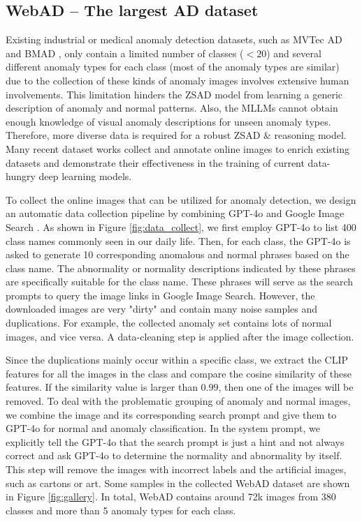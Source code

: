 \subsection{WebAD -- The largest AD dataset}
Existing industrial or medical anomaly detection datasets, such as MVTec AD \cite{mvtec} and BMAD \cite{bmad}, only contain a limited number of classes ($<20$) and several different anomaly types for each class (most of the anomaly types are similar) due to the collection of these kinds of anomaly images involves extensive human involvements. This limitation hinders the ZSAD model from learning a generic description of anomaly and normal patterns. Also, the MLLMs cannot obtain enough knowledge of visual anomaly descriptions for unseen anomaly types. Therefore, more diverse data is required for a robust ZSAD \& reasoning model. Many recent dataset works collect and annotate online images to enrich existing datasets and demonstrate their effectiveness in the training of current data-hungry deep learning models. 

To collect the online images that can be utilized for anomaly detection, we design an automatic data collection pipeline by combining GPT-4o \cite{gpt-api-4o} and Google Image Search \cite{google-image-search}. As shown in Figure \ref{fig:data_collect}, we first employ GPT-4o to list 400 class names commonly seen in our daily life. Then, for each class, the GPT-4o is asked to generate 10 corresponding anomalous and normal phrases based on the class name. The abnormality or normality descriptions indicated by these phrases are specifically suitable for the class name. These phrases will serve as the search prompts to query the image links in Google Image Search. However, the downloaded images are very "dirty" and contain many noise samples and duplications. For example, the collected anomaly set contains lots of normal images, and vice versa. A data-cleaning step is applied after the image collection.

Since the duplications mainly occur within a specific class, we extract the CLIP \cite{clip} features for all the images in the class and compare the cosine similarity of these features. If the similarity value is larger than $0.99$, then one of the images will be removed. To deal with the problematic grouping of anomaly and normal images, we combine the image and its corresponding search prompt and give them to GPT-4o for normal and anomaly classification. In the system prompt, we explicitly tell the GPT-4o that the search prompt is just a hint and not always correct and ask GPT-4o to determine the normality and abnormality by itself. This step will remove the images with incorrect labels and the artificial images, such as cartons or art. Some samples in the collected WebAD dataset are shown in Figure \ref{fig:gallery}. In total, WebAD contains around 72k images from 380 classes and more than 5 anomaly types for each class.




